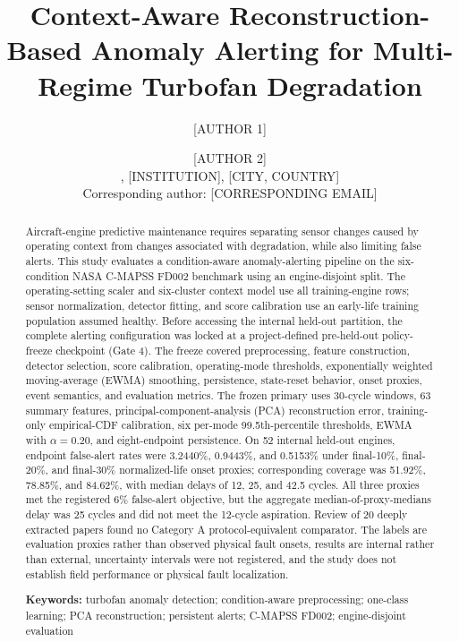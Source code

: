 \documentclass[11pt]{article}
\title{Context-Aware Reconstruction-Based Anomaly Alerting for Multi-Regime Turbofan Degradation}
\author{[AUTHOR 1] \and [AUTHOR 2]\\
[DEPARTMENT], [INSTITUTION], [CITY, COUNTRY]\\
Corresponding author: [CORRESPONDING EMAIL]}
\date{}
\begin{document}
\maketitle

\begin{abstract}

Aircraft-engine predictive maintenance requires separating sensor changes caused by operating context from changes associated with degradation, while also limiting false alerts. This study evaluates a condition-aware anomaly-alerting pipeline on the six-condition NASA C-MAPSS FD002 benchmark using an engine-disjoint split. The operating-setting scaler and six-cluster context model use all training-engine rows; sensor normalization, detector fitting, and score calibration use an early-life training population assumed healthy. Before accessing the internal held-out partition, the complete alerting configuration was locked at a project-defined pre-held-out policy-freeze checkpoint (Gate 4). The freeze covered preprocessing, feature construction, detector selection, score calibration, operating-mode thresholds, exponentially weighted moving-average (EWMA) smoothing, persistence, state-reset behavior, onset proxies, event semantics, and evaluation metrics. The frozen primary uses 30-cycle windows, 63 summary features, principal-component-analysis (PCA) reconstruction error, training-only empirical-CDF calibration, six per-mode 99.5th-percentile thresholds, EWMA with $\alpha=0.20$, and eight-endpoint persistence. On 52 internal held-out engines, endpoint false-alert rates were 3.2440\%, 0.9443\%, and 0.5153\% under final-10\%, final-20\%, and final-30\% normalized-life onset proxies; corresponding coverage was 51.92\%, 78.85\%, and 84.62\%, with median delays of 12, 25, and 42.5 cycles. All three proxies met the registered 6\% false-alert objective, but the aggregate median-of-proxy-medians delay was 25 cycles and did not meet the 12-cycle aspiration. Review of 20 deeply extracted papers found no Category A protocol-equivalent comparator. The labels are evaluation proxies rather than observed physical fault onsets, results are internal rather than external, uncertainty intervals were not registered, and the study does not establish field performance or physical fault localization.


\noindent\textbf{Keywords:} turbofan anomaly detection; condition-aware preprocessing; one-class learning; PCA reconstruction; persistent alerts; C-MAPSS FD002; engine-disjoint evaluation


\end{abstract}
\end{document}
